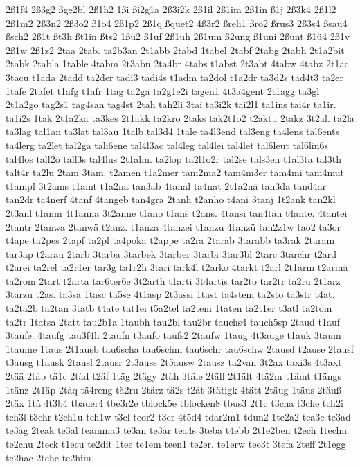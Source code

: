 {2ß1f4
2ß3g2
ßge2bl
2ß1h2
1ßi
ßi2g1a
2ß3i2k
2ß1il
2ß1im
2ß1in
ß1j
2ß3k4
2ß1l2
2ß1m2
2ß3n2
2ß3o2
ß1ö4
2ß1p2
2ß1q
ßquet2
4ß3r2
ßreli1
ßrö2
ßrus3
2ß3s4
ßsau4
ßsch2
2ß1t
ßt3h
ßt1in
ßts2
1ßu2
ß1uf
2ß1uh
2ß1um
ß2ung
ß1uni
2ßunt
ß1ü4
2ß1v
2ß1w
2ß1z2
2taa
2tab.
ta2b3an
2t1abb
2tabd
1tabel
2tabf
2tabg
2tabh
2t1a2bit
2tabk
2tabla
1table
4tabm
2t3abn
2ta4br
4tabs
t1abst
2t3abt
4tabw
4tabz
2t1ac
3tacu
t1ada
2tadd
ta2der
tadi3
tadi4s
t1adm
ta2dol
t1a2dr
ta3d2s
tad4t3
ta2er
1tafe
2tafet
t1afg
t1afr
1tag
ta2ga
ta2g1e2i
tagen1
4t3a4gent
2t1agg
ta3gl
2t1a2go
tag2s1
tag4san
tag4st
2tah
tah2li
3tai
ta3i2k
tai2l1
ta1ins
tai4r
ta1ir.
ta1i2s
1tak
2t1a2ka
ta3kes
2t1akk
ta2kro
2taks
tak2t1o2
t2aktu
2takz
3t2al.
ta2la
ta3lag
tal1an
ta3lat
tal3au
1talb
tal3d4
1tale
ta4l3end
tal3eng
ta4lens
tal6ents
ta4lerg
ta2let
tal2ga
tali6ene
tal4l3ac
tal4leg
tal4lei
tal4let
tal6leut
tal6lin6s
tal4los
tall2ö
tall3s
tal4lus
2t1alm.
ta2lop
ta2l1o2r
tal2se
tals3en
t1al3ta
tal3th
talt4r
ta2lu
2tam
3tam.
t2amen
t1a2mer
tam2ma2
tam4m3er
tam4mi
tam4mut
t1ampl
3t2ams
t1amt
t1a2na
tan3ab
4tanal
ta4nat
2t1a2nä
tan3da
tand4ar
tan2dr
ta4nerf
4tanf
4tangeb
tan4gra
2tanh
t2anho
t4ani
3tanj
1t2ank
tan2kl
2t3anl
t1anm
4t1anna
3t2anne
t1ano
t1ans
t2ans.
4tansi
tan4tan
t4ante.
4tantei
2tantr
2tanwa
2tanwä
t2anz.
t1anza
4tanzei
t1anzu
4tanzü
tan2z1w
tao2
ta3or
t4ape
ta2pes
2tapf
ta2pl
ta4poka
t2appe
ta2ra
2tarab
3tarabb
ta3rak
2taram
tar3ap
t2arau
2tarb
3tarba
3tarbek
3tarber
3tarbi
3tar3bl
2tarc
3tarchr
t2ard
t2arei
ta2rel
ta2r1er
tar3g
ta1r2h
3tari
tark4l
t2arko
4tarkt
t2arl
2t1arm
t2armä
ta2rom
2tart
t2arta
tar6ter6e
3t2arth
t1arti
3t4artis
tar2to
tar2tr
ta2ru
2t1arz
3tarzu
t2as.
ta3sa
1tasc
ta5se
4t1asp
2t3assi
1tast
ta4stem
ta2sto
ta3str
t4at.
ta2ta2b
ta2tan
3tatb
t4ate
tat1ei
t5a2tel
ta2tem
1taten
ta2t1er
t3atl
ta2tom
ta2tr
1tatsa
2tatt
tau2b1a
1taubh
tau2bl
tau2br
tauchs4
tauch5sp
2taud
t1auf
3taufe.
4taufg
tau3f4li
2taufn
t3aufo
taufs2
2taufw
1taug
4t3auge
t1auk
3taum
1taume
1taus
2t1ausb
tau6scha
tau6schm
tau6schr
tau6schw
2tausd
t2ause
2tausf
t3ausg
t1ausk
2tausl
2tausr
2t3auss
2t5ausw
2tausz
ta2van
3t2ax
taxi3s
4t3axt
2tää
2täb
tä1c
2täd
t2äf
1täg
2tägy
2täh
3täle
2täll
2t1ält
4tä2m
t1ämt
t1ängs
1tänz
2t1äp
2täq
tä4reng
tä2ru
2tärz
tä2s
t2ät
3tätigk
4tätt
2täug
1täus
2täuß
2täx
1tà
4t3b4
tbauer4
tbe3r2e
tblock5e
tblocken8
tbus3
2t1c
t3cha
t3che
tch2i
tch3l
t3chr
t2ch1u
tch1w
t3cl
tcor2
t3cr
4t5d4
tdar2m1
tdun2
1te2a2
tea3c
te3ad
te3ag
2teak
te3al
teamma3
te3an
te3ar
tea4s
3teba
t4ebb
2t1e2ben
t2ech
1techn
te2chu
2teck
t1ecu
te2dit
1tee
te1em
teen1
te2er.
te1erw
tee3t
3tefa
2teff
2t1egg
te2hac
2tehe
te2him
}
